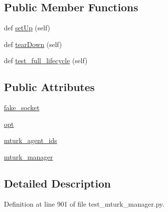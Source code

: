 \subsection*{Public Member Functions}
\begin{DoxyCompactItemize}
\item 
def \hyperlink{classparlai_1_1mturk_1_1core_1_1dev_1_1test_1_1test__mturk__manager_1_1TestMTurkManagerLifecycleFunctions_aba5d51ff898867834346b0e91104d665}{set\+Up} (self)
\item 
def \hyperlink{classparlai_1_1mturk_1_1core_1_1dev_1_1test_1_1test__mturk__manager_1_1TestMTurkManagerLifecycleFunctions_ace4806b37df5bc022c7b33061d580746}{tear\+Down} (self)
\item 
def \hyperlink{classparlai_1_1mturk_1_1core_1_1dev_1_1test_1_1test__mturk__manager_1_1TestMTurkManagerLifecycleFunctions_a33dbbefd45dab90f29727329657e7767}{test\+\_\+full\+\_\+lifecycle} (self)
\end{DoxyCompactItemize}
\subsection*{Public Attributes}
\begin{DoxyCompactItemize}
\item 
\hyperlink{classparlai_1_1mturk_1_1core_1_1dev_1_1test_1_1test__mturk__manager_1_1TestMTurkManagerLifecycleFunctions_a4ab9d14a9af11d15eec48b95d9dea751}{fake\+\_\+socket}
\item 
\hyperlink{classparlai_1_1mturk_1_1core_1_1dev_1_1test_1_1test__mturk__manager_1_1TestMTurkManagerLifecycleFunctions_af1ac135ec91429e6729faab342eb2026}{opt}
\item 
\hyperlink{classparlai_1_1mturk_1_1core_1_1dev_1_1test_1_1test__mturk__manager_1_1TestMTurkManagerLifecycleFunctions_a42ea25be9d334c2cc753a39ce9131834}{mturk\+\_\+agent\+\_\+ids}
\item 
\hyperlink{classparlai_1_1mturk_1_1core_1_1dev_1_1test_1_1test__mturk__manager_1_1TestMTurkManagerLifecycleFunctions_a3152c56d23692852f6bb1901a8a5f2c4}{mturk\+\_\+manager}
\end{DoxyCompactItemize}


\subsection{Detailed Description}


Definition at line 901 of file test\+\_\+mturk\+\_\+manager.\+py.



